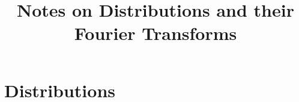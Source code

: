 \documentclass[twoside, a4paper, 10pt]{amsart}
\title[ ]{Notes on Distributions and their Fourier Transforms}
\begin{document}
\maketitle
\raggedbottom


\newcommand{\cA}{\mathcal{A}}
\newcommand{\cB}{\mathcal{B}}
\newcommand{\cC}{\mathcal{C}}
\newcommand{\cD}{\mathcal{D}}
\newcommand{\cE}{\mathcal{E}}
\newcommand{\cF}{\mathcal{F}}
\newcommand{\cG}{\mathcal{G}}
\newcommand{\cH}{\mathcal{H}}
\newcommand{\cI}{\mathcal{I}}
\newcommand{\cJ}{\mathcal{J}}
\newcommand{\cK}{\mathcal{K}}
\newcommand{\cL}{\mathcal{L}}
\newcommand{\cM}{\mathcal{M}}
\newcommand{\cN}{\mathcal{N}}
\newcommand{\cO}{\mathcal{O}}
\newcommand{\cP}{\mathcal{P}}
\newcommand{\cQ}{\mathcal{Q}}
\newcommand{\cR}{\mathcal{R}}
\newcommand{\cS}{\mathcal{S}}
\newcommand{\cT}{\mathcal{T}}
\newcommand{\cU}{\mathcal{U}}
\newcommand{\cV}{\mathcal{V}}
\newcommand{\cW}{\mathcal{W}}
\newcommand{\cX}{\mathcal{X}}
\newcommand{\cY}{\mathcal{Y}}
\newcommand{\cZ}{\mathcal{Z}}
\newcommand{\bA}{\mathbb{A}}
\newcommand{\bB}{\mathbb{B}}
\newcommand{\bC}{\mathbb{C}}
\newcommand{\bD}{\mathbb{D}}
\newcommand{\bE}{\mathbb{E}}
\newcommand{\bF}{\mathbb{F}}
\newcommand{\bG}{\mathbb{G}}
\newcommand{\bH}{\mathbb{H}}
\newcommand{\bI}{\mathbb{I}}
\newcommand{\bJ}{\mathbb{J}}
\newcommand{\bK}{\mathbb{K}}
\newcommand{\bL}{\mathbb{L}}
\newcommand{\bM}{\mathbb{M}}
\newcommand{\bN}{\mathbb{N}}
\newcommand{\bO}{\mathbb{O}}
\newcommand{\bP}{\mathbb{P}}
\newcommand{\bQ}{\mathbb{Q}}
\newcommand{\bR}{\mathbb{R}}
\newcommand{\bS}{\mathbb{S}}
\newcommand{\bT}{\mathbb{T}}
\newcommand{\bU}{\mathbb{U}}
\newcommand{\bV}{\mathbb{V}}
\newcommand{\bW}{\mathbb{W}}
\newcommand{\bX}{\mathbb{X}}
\newcommand{\bY}{\mathbb{Y}}
\newcommand{\bZ}{\mathbb{Z}}


 

\theoremstyle{definition}
\newtheorem{mydef}[dummy]{Definition}
\newtheorem{prop}[dummy]{Proposition}
\newtheorem{corol}[dummy]{Corollary}
\newtheorem{thm}[dummy]{Theorem}
\newtheorem{lemma}[dummy]{Lemma}
\newtheorem{eg}[dummy]{Example}
\newtheorem{notation}[dummy]{Notation}
\newtheorem{remark}[dummy]{Remark}
\newtheorem{claim}[dummy]{Claim}
\newtheorem{Exercise}[dummy]{Exercise}
\newtheorem{question}[dummy]{Question}

\section{Distributions}
\end{document}

